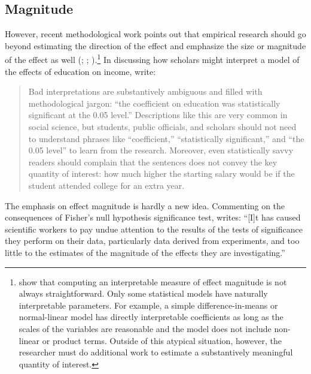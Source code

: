\documentclass[12pt]{article}
\begin{document}
\subsection*{Magnitude}

However, recent methodological work points out that empirical research should go beyond estimating the direction of the effect and emphasize the size or magnitude of the effect as well (\citealt{KingTomzWittenberg2000}; \citealt{HanmerKalkan2013}; \citealt{Gross2014}).\footnote{\cite{KingTomzWittenberg2000} show that computing an interpretable measure of effect magnitude is not always straightforward. Only some statistical models have naturally interpretable parameters. For example, a simple difference-in-means or normal-linear model has directly interpretable coefficients as long as the scales of the variables are reasonable and the model does not include non-linear or product terms. Outside of this atypical situation, however, the researcher must do additional work to estimate a substantively meaningful quantity of interest.} In discussing how scholars might interpret a model of the effects of education on income, \citet[p. 348]{KingTomzWittenberg2000} write:

\begin{quote}
Bad interpretations are substantively ambiguous and filled with methodological jargon: ``the coefficient on education was statistically significant at the 0.05 level.'' Descriptions like this are very common in social science, but students, public officials, and scholars should not need to understand phrases like ``coefficient,'' ``statistically significant,'' and ``the 0.05 level'' to learn from the research. Moreover, even statistically savvy readers should complain that the sentences does not convey the key quantity of interest: how much higher the starting salary would be if the student attended college for an extra year.
\end{quote}

The emphasis on effect magnitude is hardly a new idea. Commenting on the consequences of Fisher's null hypothesis significance test, \citet[p. 32]{Yates1951} writes: ``[I]t has caused scientific workers to pay undue attention to the results of the tests of significance they perform on their data, particularly data derived from experiments, and too little to the estimates of the magnitude of the effects they are investigating.'' %
\end{document}
